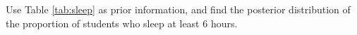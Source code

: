 \begin{enumerate}
\begin{table}[!htbp]
\begin{tabular}{cccccccccccc}
	\end{tabular}
\end{table}
Use Table \ref{tab:sleep} as prior information, and find the posterior distribution of the proportion of students who sleep at least 6 hours. 
	

\end{enumerate}



